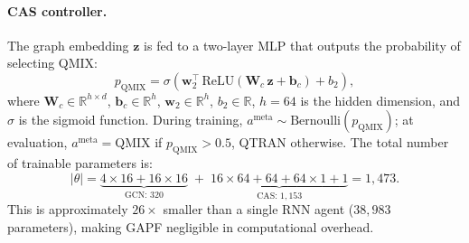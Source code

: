 \documentclass[12pt, onecolumn, journal]{IEEEtran}
\begin{document}
\paragraph{CAS controller.}
The graph embedding $\mathbf{z}$ is fed to a two-layer MLP that outputs the probability of selecting QMIX:
\begin{equation}
    p_{\text{QMIX}} = \sigma\!\left(\mathbf{w}_2^\top\,\text{ReLU}\!\left(\mathbf{W}_c\,\mathbf{z} + \mathbf{b}_c\right) + b_2\right),
    \label{eq:cas_controller}
\end{equation}
where $\mathbf{W}_c \in \mathbb{R}^{h \times d}$, $\mathbf{b}_c \in \mathbb{R}^h$, $\mathbf{w}_2 \in \mathbb{R}^h$, $b_2 \in \mathbb{R}$, $h = 64$ is the hidden dimension, and $\sigma$ is the sigmoid function. During training, $a^{\text{meta}} \sim \text{Bernoulli}(p_{\text{QMIX}})$; at evaluation, $a^{\text{meta}} = \text{QMIX}$ if $p_{\text{QMIX}} > 0.5$, QTRAN otherwise. The total number of trainable parameters is:
\begin{equation}
    |\theta| = \underbrace{4 \times 16 + 16 \times 16}_{\text{GCN: } 320} \;+\; \underbrace{16 \times 64 + 64 + 64 \times 1 + 1}_{\text{CAS: } 1{,}153} = 1{,}473.
    \label{eq:param_count}
\end{equation}
This is approximately $26\times$ smaller than a single RNN agent ($38{,}983$ parameters), making GAPF negligible in computational overhead.
\end{document}
